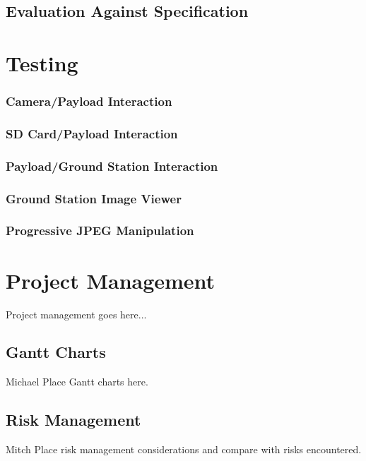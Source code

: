\documentclass[oneside]{ecsgdp}         %
\begin{document}
\section{Evaluation Against Specification}


\chapter{Testing}

\subsection{Camera/Payload Interaction}

\subsection{SD Card/Payload Interaction}

\subsection{Payload/Ground Station Interaction}

\subsection{Ground Station Image Viewer}

\subsection{Progressive JPEG Manipulation}

\chapter{Project Management}
Project management goes here...

\section{Gantt Charts}
Michael
Place Gantt charts here.

\section{Risk Management}
Mitch
Place risk management considerations and compare with risks encountered.
\end{document}

